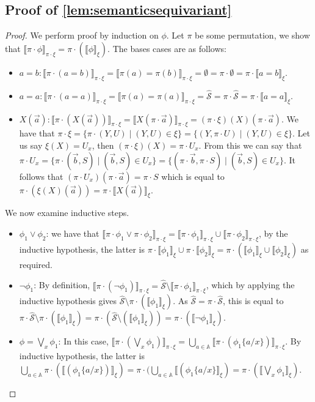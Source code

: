 \documentclass[10pt,a4paper]{article}
\theoremstyle{definition}
\theoremstyle{remark}
\newcommand\sem[2][\xi]{\llbracket#2\rrbracket_{#1}}
\newcommand\semp[2][\pi\cdot\xi]{\llbracket\pi\cdot #2\rrbracket_{#1}}
\newcommand\Scal{\mathcal{S}}
\newcommand\Atoms{\mathbb{A}}
\newcommand\fstates[0]{\hat{\Scal}}
\begin{document}
\subsection{Proof of \cref{lem:semanticsequivariant}}
\semanticsequivariant*
\begin{proof}
	We perform proof by induction on $\phi$.
	Let $\pi$ be some permutation, we show that
	$\semp{\phi} = \pi\cdot(\sem{\phi})$.
	The bases cases are as follows:
	\begin{itemize}
		\item $a=b: \semp{(a=b)} = \sem[\pi\cdot \xi]{\pi(a) = \pi(b)} = \emptyset = \pi\cdot \emptyset = \pi\cdot\sem{a=b}$.
		\item $a=a: \semp{(a=a)} = \sem[\pi\cdot \xi]{\pi(a) = \pi(a)} = \fstates = \pi\cdot \fstates = \pi\cdot\sem{a=a}$.
		\item $X(\vec a): \semp{(X(\vec a))} = \sem[\pi\cdot\xi]{X(\pi\cdot \vec a)} = (\pi\cdot\xi)(X)(\pi\cdot \vec a)$.
		We have that $\pi\cdot\xi = \{\pi\cdot (Y, U)\mid (Y,U)\in \xi\} = \{(Y, \pi \cdot U)\mid (Y,U)\in \xi\}$. 
		Let us say $\xi(X) = U_x$, then $(\pi\cdot\xi)(X) = \pi\cdot U_x$. 
		From this we can say that $\pi\cdot U_x = \{\pi\cdot (\vec b, S)\mid (\vec b, S) \in U_x\}=\{(\pi\cdot \vec b, \pi\cdot S)\mid (\vec b, S) \in U_x\}$.
		It follows that $(\pi\cdot U_x)(\pi\cdot \vec a) = \pi\cdot S$
		which is equal to 
		$\pi\cdot (\xi(X)(\vec a)) = \pi\cdot \sem{X(\vec a)}$.
	\end{itemize}
	We now examine inductive steps.\
	\begin{itemize}
		\item $\phi_1 \vee \phi_2$:
		we have that $\sem[\pi\cdot \xi]{\pi\cdot \phi_1 \vee \pi\cdot \phi_2} = \semp{\phi_1} \cup \semp{\phi_2}$, by the inductive hypothesis, the latter is $\pi\cdot \sem{\phi_1} \cup \pi\cdot \sem{\phi_2}=\pi\cdot (\sem{\phi_1}\cup\sem{\phi_2})$ as required. 
		\item $\lnot \phi_1$: 
		By definition, $\semp{(\lnot\phi_1)} = \fstates\setminus\semp{\phi_1}$, which by applying the inductive hypothesis gives $\fstates\setminus\pi\cdot (\sem{\phi_1})$.
		As $\fstates = \pi\cdot \fstates$, this is equal to $\pi\cdot \fstates\setminus\pi\cdot (\sem{\phi_1})=\pi\cdot(\fstates\setminus(\sem{\phi_1}))=\pi\cdot(\sem{\lnot\phi_1})$. 
		\item $\phi=\bigvee_{x}\phi_1$:
		In this case, $\semp{(\bigvee_{x}\phi_1)} = \bigcup_{a\in\Atoms}\semp{(\phi_1\{a/x\})}$. By inductive hypothesis, the latter is $\bigcup_{a\in\Atoms}\pi\cdot (\sem{(\phi_1\{a/x\})})=\pi\cdot (\bigcup_{a\in\Atoms}\sem{(\phi_1\{a/x\}})=\pi\cdot (\sem{\bigvee_{x}\phi_1})$.

\end{itemize}
\end{proof}
\end{document}
